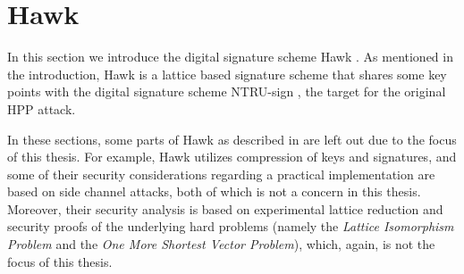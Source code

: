 \section{Hawk}
In this section we introduce the digital signature scheme Hawk \cite{HawkSpec24}.
As mentioned in the introduction, Hawk is a lattice based signature scheme that shares some key points with the digital signature scheme NTRU-sign \cite{HHPSW03}, the target for the original HPP attack.

In these sections, some parts of Hawk as described in \cite{HawkSpec24} are left out due to the focus of this thesis. For example, Hawk utilizes compression of keys and signatures, 
and some of their security considerations regarding a practical implementation are based on side channel attacks, both of which is not a concern in this thesis.
Moreover, their security analysis is based on experimental lattice reduction and security proofs of the underlying hard problems (namely the \textit{Lattice Isomorphism Problem} and 
the \textit{One More Shortest Vector Problem}), which, again, is not the focus of this thesis. 

